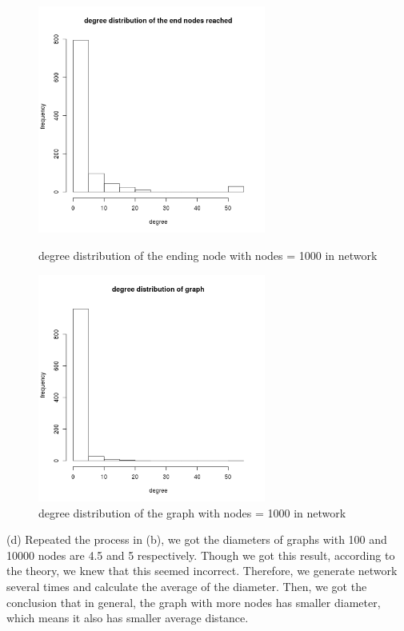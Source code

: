 \documentclass[draftcls,12pt,onecolumn]{IEEEtran}
\begin{document}
\begin{figure}[htbp]
\centering
\begin{minipage}[t]{0.48\textwidth}
\centering
\includegraphics[width=7.5cm]{2_2_c_end_nodes_degree.png}
\caption{degree distribution of the ending node with nodes = 1000 in network}
\label{fig12}
\end{minipage}
\begin{minipage}[t]{0.48\textwidth}
\centering
\includegraphics[width=7.5cm]{2_2_c_graph_degree.png}
\caption{degree distribution of the graph with nodes = 1000 in network}
\label{fig13}
\end{minipage}
\end{figure}

(d) Repeated the process in (b), we got the diameters of graphs with 100 and 10000 nodes are 4.5 and 5 respectively. Though we got this result, according to the theory, we knew that this seemed incorrect. Therefore, we generate network several times and calculate the average of the diameter. Then, we got the conclusion that in general, the graph with more nodes has smaller diameter, which means it also has smaller average distance.
\end{document}
